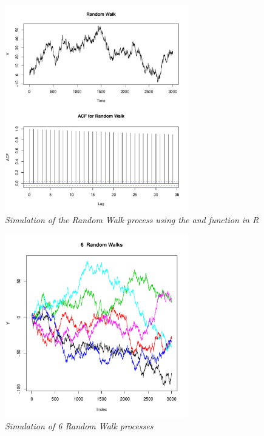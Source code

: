 \begin{figure}
    \centering
    \includegraphics[width=80mm]{random-walk.pdf}
    \caption{\textit{Simulation of the Random Walk process using the  and  function in R}}
    \label{fig:randomwalk}
\end{figure}

\begin{figure}
    \centering
    \includegraphics[width=80mm]{multiple-random-walk.pdf}
    \caption{\textit{Simulation of 6 Random Walk processes}}
    \label{fig:multiple-randomwalks}
\end{figure}

